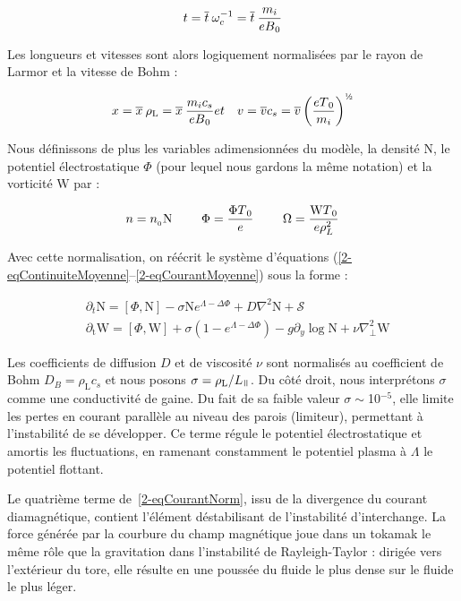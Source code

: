 \begin{refsection}
\begin{equation}
t = \overline{t}\:\omega_c^{{-1}} =
\overline{t}\:\frac{m_i}{eB{_{0}}}
\end{equation}

Les longueurs et vitesses sont alors logiquement normalisées par le rayon de
Larmor et la vitesse de Bohm :

\begin{eqnarray}
x = \overline{x}\:\rho_\text{L} =
\overline{x}\:\frac{m_ic_s}{eB\indice{0}} &
et &
v=\overline{v}c_s=\overline{v}\left(\frac{eT\indice{0}}{m_i}\right)^{\text{\textonehalf}}
\end{eqnarray}

Nous définissons de plus les variables adimensionnées du modèle, la densité
$\text{N}$, le potentiel électrostatique $\Phi$ (pour lequel nous gardons la
même notation) et la vorticité $\text{W}$ par :

\begin{eqnarray}
n = n_{{_{0}}}\text{N} \text{~~~~~~~} \Phi=\frac{\Phi T{_{0}}}{e}
\text{~~~~~~~} \Omega=\frac{\text{W} T{_{0}}}{e\rho_L^2}
\end{eqnarray}

Avec cette normalisation, on
réécrit le système d'équations
(\eqref{2-eqContinuiteMoyenne}--\eqref{2-eqCourantMoyenne}) sous la forme :

\begin{align}
\label{2-eqContinuiteNorm}
&\partial_t \text{N}
= \left[\Phi,\text{N}\right] -\sigma \text{N}e^{\Lambda-\Delta\Phi}
 + D\nabla^2 \text{N} + \mathcal{S}
\\
\label{2-eqCourantNorm}
&\partial_\text{t}\text{W} = 
\left[\Phi,\text{W}\right]
+\sigma\left(1-e^{\Lambda-\Delta\Phi}\right) 
-g\partial_y\log\text{N}
+\nu\nabla_\perp^2\text{W}
\end{align}
 
Les coefficients de diffusion $D$ et de viscosité $\nu$ sont normalisés au
coefficient de Bohm $D_B=\rho_\text{L}c_s$ et nous posons
$\sigma=\rho_\text{L}/L_\para$. Du côté droit, nous interprétons $\sigma$
comme une conductivité de gaine. Du fait de sa faible valeur
$\sigma\sim$10$^{-5}$, elle limite les pertes en courant parallèle au niveau des
parois (limiteur), permettant à l'instabilité de se développer. Ce terme régule
le potentiel électrostatique et amortis les fluctuations, en ramenant constamment
le potentiel plasma à $\Lambda$ le potentiel flottant.

Le quatrième terme de~\eqref{2-eqCourantNorm}, issu de la divergence
du courant diamagnétique, contient l'élément déstabilisant de
 l'instabilité d'interchange. La force générée par la courbure du champ
 magnétique joue dans un tokamak le même rôle que la gravitation dans
 l'instabilité de Rayleigh-Taylor : dirigée vers l'extérieur du tore, elle 
 résulte en une poussée du fluide le plus dense sur le fluide le plus léger. 
 

\end{refsection}

